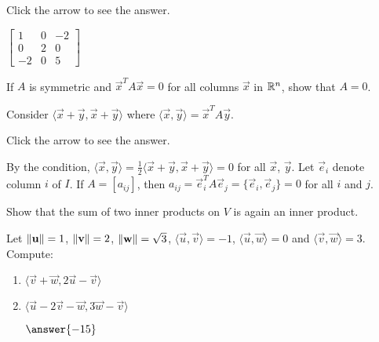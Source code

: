 \documentclass{ximera}
\begin{document}
\begin{problem}
\begin{enumerate}
Click the arrow to see the answer.
\begin{expandable}
$\left[ \begin{array}{rrr}
1 & 0 & -2 \\
0 & 2 & 0 \\
-2 & 0 & 5
\end{array} \right]$
\end{expandable}

\end{enumerate}
\end{problem}

\begin{problem}\label{prob:inner_prod_14}
If $A$ is symmetric and $\vec{x}^{T}A\vec{x} = 0$ for all columns $\vec{x}$ in $\mathbb{R}^n$, show that $A = 0$. 

\begin{hint}
Consider
$\langle \vec{x} + \vec{y}, \vec{x} + \vec{y} \rangle$ where $\langle \vec{x}, \vec{y} \rangle = \vec{x}^TA\vec{y}$.
\end{hint}

Click the arrow to see the answer.
\begin{expandable}
By the condition, $\langle \vec{x}, \vec{y} \rangle = \frac{1}{2} \langle \vec{x} + \vec{y}, \vec{x} + \vec{y} \rangle = 0$ for all $\vec{x}$, $\vec{y}$. Let $\vec{e}_{i}$ denote column $i$ of $I$. If $A = \left[ a_{ij} \right]$, then $a_{ij} = \vec{e}_{i}^{T}A\vec{e}_{j} = \{\vec{e}_{i}, \vec{e}_{j}\} = 0$ for all $i$ and $j$.
\end{expandable}
\end{problem}

\begin{problem}\label{prob:inner_prod_15}
Show that the sum of two inner products on $V$ is again an inner product.
\end{problem}

\begin{problem} \label{ex:10_1_16}
Let $ \left\lVert \mathbf{u} \right\rVert = 1$, $\left\lVert \mathbf{v} \right\rVert = 2$, $\left\lVert \mathbf{w} \right\rVert = \sqrt{3} $, $\langle \vec{u}, \vec{v} \rangle = -1$, $\langle\vec{u}, \vec{w}\rangle = 0$ and $\langle\vec{v}, \vec{w}\rangle = 3$. Compute:
\begin{enumerate}
\item $\langle \vec{v} + \vec{w}, 2\vec{u} - \vec{v} \rangle$
\item $\langle \vec{u} - 2 \vec{v} - \vec{w}, 3\vec{w} - \vec{v} \rangle$

$\answer{-15}$
\end{enumerate}

\end{problem}
\end{document}
